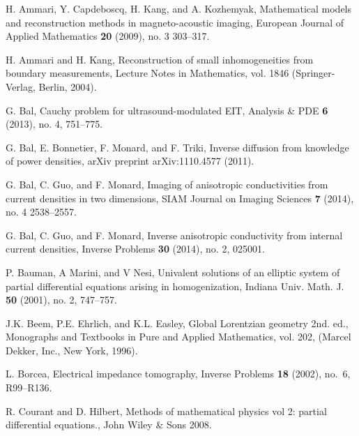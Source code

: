 \documentclass[11pt]{amsart}
\theoremstyle{plain}
\theoremstyle{remark}
\numberwithin{equation}{section}
\numberwithin{Thm}{section}
\begin{document}
%

\begin{thebibliography}{10}

    
       

        {H. Ammari, Y. Capdeboscq, H. Kang, and A. Kozhemyak},
        {Mathematical models and reconstruction methods in magneto-acoustic imaging}, 
        European Journal of Applied Mathematics \textbf{20} (2009), no. 3  303--317.%

        {H. Ammari and H. Kang}, 
        {Reconstruction of small inhomogeneities from boundary measurements}, 
        Lecture Notes in Mathematics, vol. 1846 (Springer-Verlag, Berlin, 2004). %

        {G. Bal}, 
        {Cauchy problem for ultrasound-modulated EIT}, 
        Analysis \& PDE \textbf{6} (2013), no. 4, 751--775.

        {G. Bal, E. Bonnetier, F. Monard, and F. Triki}, 
        {Inverse diffusion from knowledge of power densities},
        arXiv preprint arXiv:1110.4577 (2011).

        {G. Bal, C. Guo, and F. Monard}, 
        {Imaging of anisotropic conductivities from current densities in two dimensions}, 
        SIAM Journal on Imaging Sciences \textbf{7} (2014), no. 4 2538--2557.

        {G. Bal, C. Guo, and F. Monard}, 
        {Inverse anisotropic conductivity from internal current densities}, 
        Inverse Problems \textbf{30} (2014), no. 2, 025001.

        {P. Bauman, A Marini, and V Nesi}, 
        {Univalent solutions  of an elliptic system of partial differential equations arising in homogenization}, Indiana Univ. Math. J. \textbf{50} (2001), no. 2, 747--757.

        {J.K. Beem, P.E. Ehrlich, and K.L. Easley}, 
        {Global Lorentzian geometry 2nd. ed.}, 
        Monographs and Textbooks in Pure and Applied Mathematics, vol. 202, 
        (Marcel Dekker, Inc., New York, 1996). %
  
L. Borcea, {Electrical impedance tomography}, Inverse Problems
  \textbf{18} (2002), no.~6, R99--R136. %

        {R. Courant and D. Hilbert},
        {Methods of mathematical physics vol 2: partial differential equations.},
        {John Wiley \& Sons 2008}.


\end{thebibliography}
\end{document}
